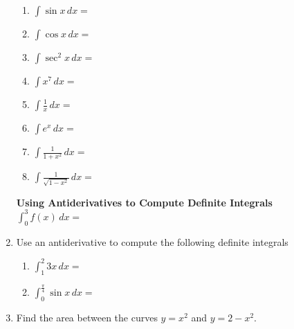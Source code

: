 \documentclass[12pt]{article}
\begin{document}
\begin{enumerate}
\begin{multicols}{2}
\begin{enumerate}[itemsep=1cm]
\item $\displaystyle \int \sin x\,dx=$
\item $\displaystyle \int \cos x\,dx=$
\item $\displaystyle \int \sec^2 x\,dx=$
\item $\displaystyle \int  x^7\,dx=$
\item $\displaystyle \int\frac{1}{x}\,dx=$
\item $\displaystyle \int e^x\,dx=$
\item $\displaystyle \int \frac{1}{1+x^2}\,dx=$
\item $\displaystyle \int \frac{1}{\sqrt{1-x^2}}\,dx=$
\end{enumerate}
\end{multicols}
\vfill
\begin{tcolorbox}
\textbf{Using Antiderivatives to Compute Definite Integrals}\\

$\displaystyle \int_0^3 f(x) \, dx =$ \underline{\hspace{4cm}}
\end{tcolorbox}
\vfill
\item Use an antiderivative to compute the following definite integrals


\begin{enumerate}
\item $\displaystyle \int_1^2 3x\,dx=$
\vfill
\item $\displaystyle \int_0^{\frac{\pi}{4}} \sin x\,dx=$
\vfill
\end{enumerate}

\item Find the area between the curves $y=x^2$ and $y=2-x^2$.
\vfill
\end{enumerate}
\end{document}
